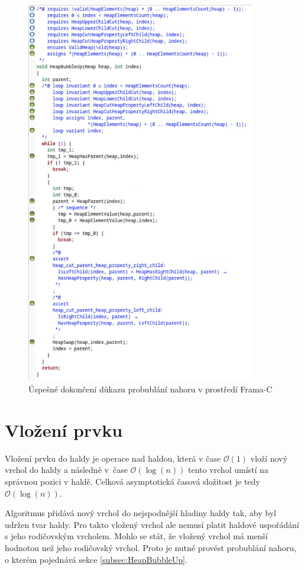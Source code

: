 \begin{figure}[H]
	\centering
	\includegraphics[width=10cm]{images/frama-c-HeapBubbleUp}
	\caption{Úspešné dokončení důkazu probublání nahoru v prostředí Frama-C}
	\label{img:F-C-HeapBubbleUp}
\end{figure}

\section{Vložení prvku}
\label{subsec:HeapInsert}

Vložení prvku do haldy je operace nad haldou, která v čase $\mathcal{O}(1)$ vloží nový vrchol do haldy a následně v~čase $\mathcal{O}(\log(n))$ tento vrchol umístí na správnou pozici v haldě. Celková asymptotická časová složitost je tedy $\mathcal{O}(\log(n))$.

Algoritmus přidává nový vrchol do nejspodnější hladiny haldy tak, aby byl udržen tvar haldy. Pro takto vložený vrchol ale nemusí platit haldové uspořádání s jeho rodičovským vrcholem. Mohlo se stát, že vložený vrchol má menší hodnotou než jeho rodičovský vrchol. Proto je nutné provést probublání nahoru, o kterém pojednává sekce \ref{subsec:HeapBubbleUp}.

